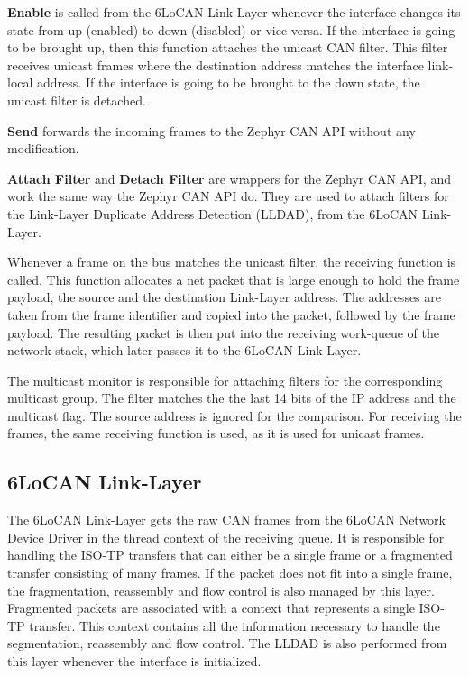 \textbf{Enable} is called from the 6LoCAN Link-Layer whenever the interface changes its state from up (enabled) to down (disabled) or vice versa.
If the interface is going to be brought up, then this function attaches the unicast CAN filter.
This filter receives unicast frames where the destination address matches the interface link-local address.
If the interface is going to be brought to the down state, the unicast filter is detached.

\textbf{Send} forwards the incoming frames to the Zephyr CAN API without any modification.

\textbf{Attach Filter} and \textbf{Detach Filter} are wrappers for the Zephyr CAN API, and work the same way the Zephyr CAN API do.
They are used to attach filters for the Link-Layer Duplicate Address Detection (LLDAD), from the 6LoCAN Link-Layer.

Whenever a frame on the bus matches the unicast filter, the receiving function is called.
This function allocates a net packet that is large enough to hold the frame payload, the source and the destination Link-Layer address.
The addresses are taken from the frame identifier and copied into the packet, followed by the frame payload.
The resulting packet is then put into the receiving work-queue of the network stack, which later passes it to the 6LoCAN Link-Layer.

The multicast monitor is responsible for attaching filters for the corresponding multicast group.
The filter matches the the last 14 bits of the IP address and the multicast flag. The source address is ignored for the comparison.
For receiving the frames, the same receiving function is used, as it is used for unicast frames.

\subsection{6LoCAN Link-Layer}
\label{sec:6locan_l2}

The 6LoCAN Link-Layer gets the raw CAN frames from the 6LoCAN Network Device Driver in the thread context of the receiving queue.
It is responsible for handling the ISO-TP transfers that can either be a single frame or a fragmented transfer consisting of many frames.
If the packet does not fit into a single frame, the fragmentation, reassembly and flow control is also managed by this layer.
Fragmented packets are associated with a context that represents a single ISO-TP transfer.
This context contains all the information necessary to handle the segmentation, reassembly and flow control.
The LLDAD is also performed from this layer whenever the interface is initialized.

